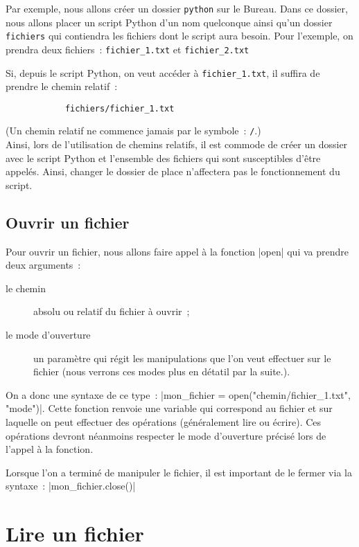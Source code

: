 		Par exemple, nous allons créer un dossier \verb|python| sur le Bureau. Dans ce dossier, nous allons placer un script Python d'un nom quelconque ainsi qu'un dossier \verb|fichiers| qui contiendra les fichiers dont le script aura besoin. Pour l'exemple, on prendra deux fichiers~: \verb|fichier_1.txt| et \verb|fichier_2.txt|
	
		Si, depuis le script Python, on veut accéder à \verb|fichier_1.txt|, il suffira de prendre le chemin relatif~:
		\begin{verbatim}
			fichiers/fichier_1.txt
		\end{verbatim}
	
		(Un chemin relatif ne commence jamais par le symbole~: \verb|/|.) \\
		Ainsi, lors de l'utilisation de chemins relatifs, il est commode de créer un dossier avec le script Python et l'ensemble des fichiers qui sont susceptibles d'être appelés. Ainsi, changer le dossier de place n'affectera pas le fonctionnement du script.

	\subsection{Ouvrir un fichier}
	
	Pour ouvrir un fichier, nous allons faire appel à la fonction \python|open| qui va prendre deux arguments~:
	\begin{description}
		\item[le chemin] absolu ou relatif du fichier à ouvrir~;
		\item[le mode d'ouverture] un paramètre qui régit les manipulations que l'on veut effectuer sur le fichier (nous verrons ces modes plus en détatil par la suite.).
	\end{description}
	
	On a donc une syntaxe de ce type~: \python|mon_fichier = open("chemin/fichier_1.txt", "mode")|.
	Cette fonction renvoie une variable qui correspond au fichier et sur laquelle on peut effectuer des opérations (généralement lire ou écrire). Ces opérations devront néanmoins respecter le mode d'ouverture précisé lors de l'appel à la fonction.
	
	Lorsque l'on a terminé de manipuler le fichier, il est important de le fermer via la syntaxe~: \python|mon_fichier.close()|

\section{Lire un fichier}


